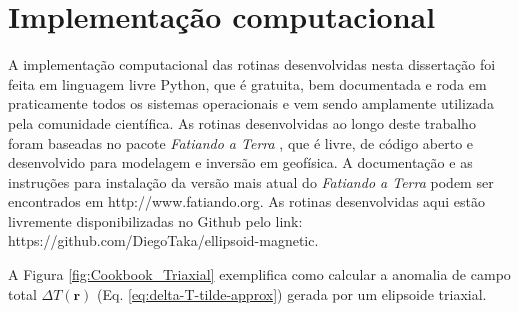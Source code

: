 \chapter{Implementação computacional}

A implementação computacional das rotinas desenvolvidas nesta dissertação foi feita em linguagem livre Python, que é gratuita, bem documentada e roda em praticamente todos os sistemas operacionais e vem sendo amplamente utilizada pela comunidade científica.  
As rotinas desenvolvidas ao longo deste trabalho foram baseadas no pacote \textit{Fatiando a Terra} \citet{uieda-proc-scipy-2013}, que é livre, de código aberto e desenvolvido para modelagem e inversão em geofísica. A documentação e as instruções para instalação da versão mais atual do \textit{Fatiando a Terra} podem ser encontrados em http://www.fatiando.org.
As rotinas desenvolvidas aqui estão livremente disponibilizadas no Github pelo link: https://github.com/DiegoTaka/ellipsoid-magnetic.

A Figura \ref{fig:Cookbook_Triaxial} exemplifica como calcular a anomalia de campo total $\Delta T (\mathbf{r})$ (Eq. \ref{eq:delta-T-tilde-approx}) gerada por um elipsoide triaxial.

